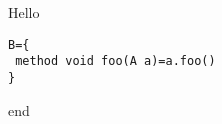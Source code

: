  
Hello
\vspace{-1ex}
\begin{lstlisting}
B={
 method void foo(A a)=a.foo()
}
\end{lstlisting}
\vspace{-1ex}
end
